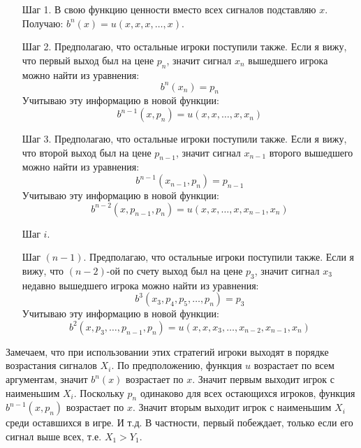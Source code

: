 \begin{itemize}
\begin{enumerate}
\item[Шаг 1.] В свою функцию ценности вместо всех сигналов подставляю $ x $. Получаю: $b^{n}(x)=u(x,x,x,\ldots,x)$.
\item[Шаг 2.] Предполагаю, что остальные игроки поступили также. Если я вижу, что первый выход был на цене $ p_{n} $, значит сигнал $x_{n}  $ вышедшего игрока можно найти из уравнения:
\begin{equation}
b^{n}(x_{n})=p_{n}
\end{equation}
Учитываю эту информацию в новой функции:
\begin{equation}
b^{n-1}(x,p_{n})=u(x,x,\ldots,x,x_{n})
\end{equation}
\item[Шаг 3.] Предполагаю, что остальные игроки поступили также. Если я вижу, что второй выход был на цене $ p_{n-1} $, значит сигнал $ x_{n-1} $ второго вышедшего можно найти из уравнения:
\begin{equation}
b^{n-1}(x_{n-1},p_{n})=p_{n-1}
\end{equation}
Учитываю эту информацию в новой функции:
\begin{equation}
b^{n-2}(x,p_{n-1},p_{n})=u(x,x,\ldots,x,x_{n-1},x_{n})
\end{equation}
\item[Шаг $ i $.]

\item[Шаг $ (n-1) $.] Предполагаю, что остальные игроки поступили также. Если я вижу, что $ (n-2) $-ой по счету выход был на цене $ p_{3} $, значит сигнал $ x_{3} $ недавно вышедшего игрока можно найти из уравнения:
\begin{equation}
b^{3}(x_{3},p_{4},p_{5},\ldots,p_{n})=p_{3}
\end{equation}
Учитываю эту информацию в новой функции:
\begin{equation}
b^{2}(x,p_{3},\ldots,p_{n-1},p_{n})=u(x,x,x_{3},\ldots,x_{n-2},x_{n-1},x_{n})
\end{equation}

\end{enumerate}

Замечаем, что при использовании этих стратегий игроки выходят в порядке возрастания сигналов $ X_{i} $. По предположению, функция $ u $ возрастает по всем аргументам, значит $ b^{n}(x) $ возрастает по $ x $. Значит первым выходит игрок с наименьшим $ X_{i} $. Поскольку $ p_{n} $ одинаково для всех остающихся игроков, функция $ b^{n-1}(x,p_{n}) $ возрастает по $ x $. Значит вторым выходит игрок с наименьшим $ X_{i} $ среди оставшихся в игре. И т.д. В частности, первый побеждает, только если его сигнал выше всех, т.е. $ X_{1}>Y_{1} $.


\end{itemize}
